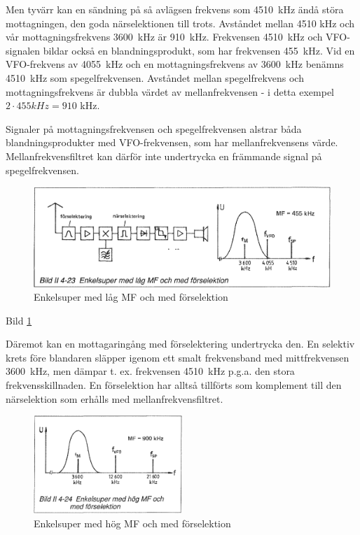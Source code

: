 Men tyvärr kan en sändning på så avlägsen frekvens som 4510~kHz ändå
störa mottagningen, den goda närselektionen till trots. Avståndet
mellan 4510 kHz och vår mottagningsfrekvens 3600~kHz är 910~kHz.
Frekvensen 4510~kHz och VFO-signalen bildar också en
blandningsprodukt, som har frekvensen 455~kHz. Vid en VFO-frekvens av
4055~kHz och en mottagningsfrekvens av 3600~kHz benämns 4510~kHz som
spegelfrekvensen. Avståndet mellan spegelfrekvens och
mottagningsfrekvens är dubbla värdet av mellanfrekvensen - i detta
exempel \(2 \cdot 455kHz = 910\) kHz.

Signaler på mottagningsfrekvensen och spegelfrekvensen alstrar båda
blandningsprodukter med VFO-frekvensen, som har mellanfrekvensens
värde. Mellanfrekvensfiltret kan därför inte undertrycka en främmande
signal på spegelfrekvensen.

\begin{figure}
  \includegraphics[width=\textwidth]{images/bild_2_4-23}
  \caption{Enkelsuper med låg MF och med förselektion}
  \label{fig:bildII4-23}
\end{figure}

Bild \ref{fig:bildII4-23}

Däremot kan en mottagaringång med förselektering undertrycka den. En
selektiv krets före blandaren släpper igenom ett smalt frekvensband
med mittfrekvensen 3600~kHz, men dämpar t. ex. frekvensen 4510~kHz
p.g.a. den stora frekvensskillnaden. En förselektion har alltså
tillförts som komplement till den närselektion som erhålls med
mellanfrekvensfiltret.

\begin{figure}
  \includegraphics[width=0.5\textwidth]{images/bild_2_4-24}
  \caption{Enkelsuper med hög MF och med förselektion}
  \label{fig:bildII4-24}
\end{figure}

